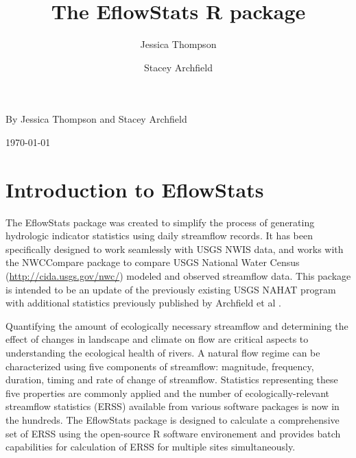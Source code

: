 \documentclass[a4paper,11pt]{article}\usepackage[]{graphicx}\usepackage[]{color}
\begin{document}
\renewenvironment{knitrout}{\begin{singlespace}}{\end{singlespace}}
\renewcommand*\listfigurename{Figures}
\renewcommand*\listtablename{Tables}

\title{The EflowStats R package}
\author[1]{Jessica Thompson}
\author[1]{Stacey Archfield}




\noindent\textsf{By Jessica Thompson and Stacey Archfield}

\noindent\textsf{\today}

\tableofcontents
\listoftables

\section{Introduction to EflowStats}
                
The EflowStats package was created to simplify the process of generating hydrologic indicator statistics using daily streamflow records. It has been specifically designed to work seamlessly with USGS NWIS data, and works with the NWCCompare package to compare USGS National Water Census (\url {http://cida.usgs.gov/nwc/}) modeled and observed streamflow data. This package is intended to be an update of the previously existing USGS NAHAT program \cite{NAHAT} with additional statistics previously published by Archfield et al \cite{Archfield}.     
              
Quantifying the amount of ecologically necessary streamflow and determining the effect of changes in landscape and climate on flow are critical aspects to understanding the ecological health of rivers. A natural flow regime can be characterized using five components of streamflow: magnitude, frequency, duration, timing and rate of change of streamflow. Statistics representing these five properties are commonly applied and the number of ecologically-relevant streamflow statistics (ERSS) available from various software packages is now in the hundreds. The EflowStats package is designed to calculate a comprehensive set of ERSS using the open-source R software environement and provides batch capabilities for calculation of ERSS for multiple sites simultaneously. 
\end{document}
